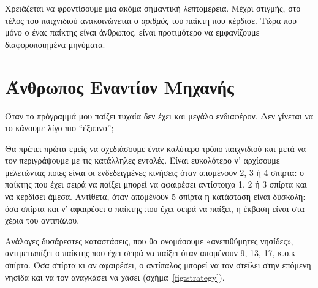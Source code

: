 \documentclass[a4paper,11pt,oneside]{book}
\begin{document}
Χρειάζεται να φροντίσουμε μια ακόμα σημαντική λεπτομέρεια. Μέχρι στιγμής, στο τέλος του παιχνιδιού ανακοινώνεται ο \emph{αριθμός} του παίκτη που κέρδισε. Τώρα που μόνο ο ένας παίκτης είναι άνθρωπος, είναι προτιμότερο να εμφανίζουμε διαφοροποιημένα μηνύματα.



\section{Άνθρωπος Εναντίον Μηχανής}

\begin{question}
Όταν το πρόγραμμά μου παίζει τυχαία δεν έχει και μεγάλο ενδιαφέρον. Δεν γίνεται να το κάνουμε λίγο πιο ``έξυπνο'';
\end{question} 

Θα πρέπει πρώτα εμείς να σχεδιάσουμε έναν καλύτερο τρόπο παιχνιδιού και μετά να τον περιγράψουμε με τις κατάλληλες εντολές. Είναι ευκολότερο ν' αρχίσουμε μελετώντας ποιες είναι οι ενδεδειγμένες κινήσεις όταν απομένουν 2, 3 ή 4 σπίρτα: ο παίκτης που έχει σειρά να παίξει μπορεί να αφαιρέσει αντίστοιχα 1, 2 ή 3 σπίρτα και να κερδίσει άμεσα. Αντίθετα, όταν απομένουν 5 σπίρτα η κατάσταση είναι δύσκολη: όσα σπίρτα και ν' αφαιρέσει ο παίκτης που έχει σειρά να παίξει, η έκβαση είναι στα χέρια του αντιπάλου. 

Ανάλογες δυσάρεστες καταστάσεις, που θα ονομάσουμε «ανεπιθύμητες νησίδες», αντιμετωπίζει ο παίκτης που έχει σειρά να παίξει όταν απομένουν 9, 13, 17, κ.ο.κ σπίρτα. Όσα σπίρτα κι αν αφαιρέσει, ο αντίπαλος μπορεί να τον στείλει στην επόμενη νησίδα και να τον αναγκάσει να χάσει (σχήμα~\ref{fig:strategy}).
\end{document}
